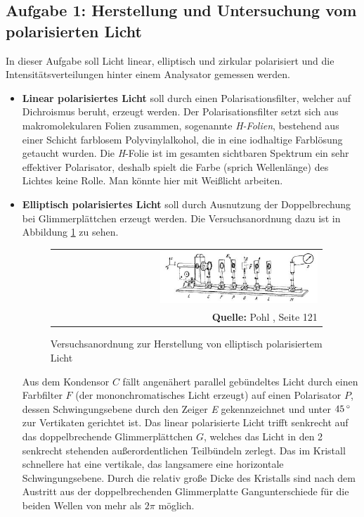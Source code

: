 \documentclass[a4paper,titlepage]{scrartcl}
\numberwithin{equation}{section}
\begin{document}
\subsection{Aufgabe 1: Herstellung und Untersuchung vom polarisierten Licht}
In dieser Aufgabe soll Licht linear, elliptisch und zirkular polarisiert und die Intensitätsverteilungen hinter einem Analysator gemessen werden.
\begin{itemize}
\item \textbf{Linear polarisiertes Licht} soll durch einen Polarisationsfilter, welcher auf Dichroismus beruht, erzeugt werden. Der Polarisationsfilter setzt sich aus makromolekularen Folien zusammen, sogenannte \emph{H-Folien}, bestehend aus einer Schicht farblosem Polyvinylalkohol, die in eine iodhaltige Farblösung getaucht wurden. Die \emph{H}-Folie ist im gesamten sichtbaren Spektrum ein sehr effektiver Polarisator, deshalb spielt die Farbe (sprich Wellenlänge) des Lichtes keine Rolle. Man könnte hier  mit Weißlicht arbeiten.
\item \textbf{Elliptisch polarisiertes Licht} soll durch Ausnutzung der Doppelbrechung bei Glimmerplättchen erzeugt werden. Die Versuchsanordnung dazu ist in Abbildung \ref{fig:glimmer} zu sehen.
\begin{figure}[H]
	\centering
	\begin{tabular}{@{}r@{}}
		\includegraphics[width=0.6\textwidth]{bilder/glimmer.JPG}\\
		\footnotesize\sffamily\textbf{Quelle:} Pohl \cite{pohl}, Seite 121
	\end{tabular}
	\caption{Versuchsanordnung zur Herstellung von elliptisch polarisiertem Licht}
	\label{fig:glimmer}
\end{figure}
Aus dem Kondensor $C$ fällt angenähert parallel gebündeltes Licht durch einen Farbfilter $F$ (der mononchromatisches Licht erzeugt) auf einen Polarisator $P$, dessen Schwingungsebene durch den Zeiger \emph{E} gekennzeichnet und unter $\unit[45]{^\circ}$ zur Vertikaten gerichtet ist. Das linear polarisierte Licht trifft senkrecht auf das doppelbrechende Glimmerplättchen $G$, welches das Licht in den 2 senkrecht stehenden außerordentlichen Teilbündeln zerlegt. Das im Kristall schnellere hat eine vertikale, das langsamere eine horizontale Schwingungsebene. Durch die relativ große Dicke des Kristalls sind nach dem Austritt aus der doppelbrechenden Glimmerplatte Gangunterschiede für die beiden Wellen von mehr als $2 \pi$ möglich.\\ \\

\end{itemize}
\end{document}
